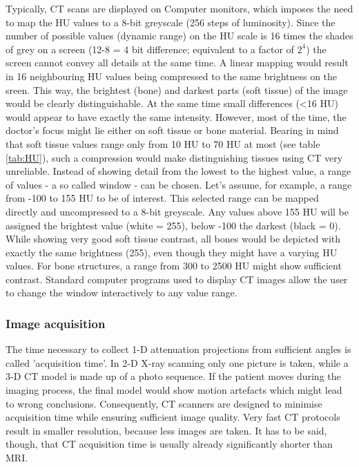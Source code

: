 Typically, CT scans are displayed on Computer monitors, which imposes the need to map the HU values to a 8-bit greyscale (256 steps of luminosity).
Since the number of possible values (dynamic range) on the HU scale is 16 times the shades of grey on a screen (12-8 = 4 bit difference; equivalent to a factor of $2^4$) the screen cannot convey all details at the same time.
A linear mapping would result in 16 neighbouring HU values being compressed to the same brightness on the sreen.
This way, the brightest (bone) and darkest parts (soft tissue) of the image would be clearly distinguishable.
At the same time small differences (<16 HU) would appear to have exactly the same intensity.
However, most of the time, the doctor's focus might lie either on soft tissue or bone material.
Bearing in mind that soft tissue values range only from 10 HU to 70 HU at most (see table \ref{tab:HU}), such a compression would make distinguishing tissues using CT very unreliable.
Instead of showing detail from the lowest to the highest value, a range of values - a so called window - can be chosen.
Let's assume, for example, a range from -100 to 155 HU to be of interest.
This selected range can be mapped directly and uncompressed to a 8-bit greyscale.
Any values above 155 HU will be assigned the brightest value (white = 255), below -100 the darkest (black = 0).
While showing very good soft tissue contrast, all bones would be depicted with exactly the same brightness (255), even though they might have a varying HU values.
For bone structures, a range from 300 to 2500 HU might show sufficient contrast.
Standard computer programs used to display CT images allow the user to change the window interactively to any value range. \cite{Podgorsak, Maidment2014}

\subsubsection{Image acquisition}
The time necessary to collect 1-D attenuation projections from sufficient angles is called 'acquisition time'.
In 2-D X-ray scanning only one picture is taken, while a 3-D CT model is made up of a photo sequence.
If the patient moves during the imaging process, the final model would show motion artefacts which might lead to wrong conclusions.
Consequently, CT scanners are designed to minimise acquisition time while ensuring sufficient image quality.
Very fast CT protocols result in smaller resolution, because less images are taken.
It has to be said, though, that CT acquisition time is usually already significantly shorter than MRI. \cite{Podgorsak, Maidment2014}

